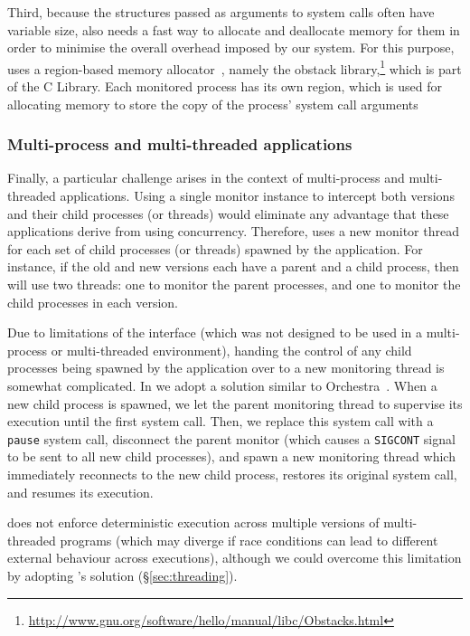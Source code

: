 Third, because the structures passed as arguments to system calls often have
variable size, \mxm also needs a fast way to allocate and deallocate memory
for them in order to minimise the overall overhead imposed by our system.  For
this purpose, \mxm uses a region-based memory allocator~\cite{memory-pools},
namely the \textsf{obstack}
library,\footnote{\url{http://www.gnu.org/software/hello/manual/libc/Obstacks.html}}
which is part of the \gnu C Library.  Each monitored process has its own
region, which is used for allocating memory to store the copy of the process'
system call arguments

\subsubsection{Multi-process and multi-threaded applications}

Finally, a particular challenge arises in the context of multi-process and
multi-threaded applications.  Using a single monitor instance to intercept both
versions and their child processes (or threads) would eliminate any advantage
that these applications derive from using concurrency.  Therefore, \mxm uses a
new monitor thread for each set of child processes (or threads) spawned by the
application.  For instance, if the old and new versions each have a parent and
a child process, then \mxm will use two threads: one to monitor the parent
processes, and one to monitor the child processes in each version.

Due to limitations of the \ptrace interface (which was not designed to be used
in a multi-process or multi-threaded environment), handing the control of any
child processes being spawned by the application over to a new monitoring
thread is somewhat complicated.  In \mxm we adopt a solution similar to
Orchestra~\cite{orchestra09}.  When a new child process is spawned, we let the
parent monitoring thread to supervise its execution until the first system
call.  Then, we replace this system call with a \lstinline`pause` system call,
disconnect the parent monitor (which causes a \lstinline`SIGCONT` signal to be
sent to all new child processes), and spawn a new monitoring thread which
immediately reconnects to the new child process, restores its original system
call, and resumes its execution.

\mxm does not enforce deterministic execution across multiple versions of
multi-threaded programs (which may diverge if race conditions can lead
to different external behaviour across executions), although we could
overcome this limitation by adopting \varan's solution
(\S\ref{sec:threading}).

